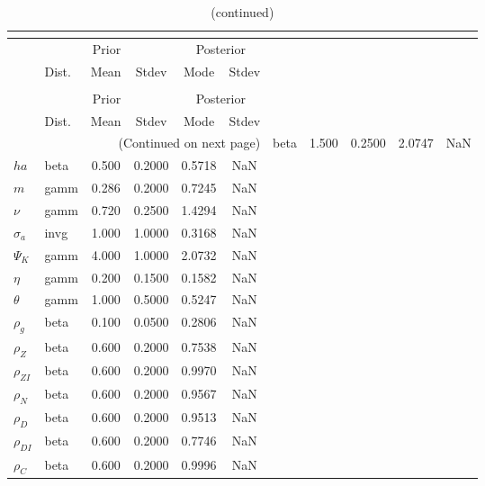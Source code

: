  
\begin{center}
\begin{longtable}{llcccc} 
\caption{Results from posterior maximization (parameters)}\\
 \label{Table:Posterior:1}\\
\toprule 
  & \multicolumn{3}{c}{Prior}  &  \multicolumn{2}{c}{Posterior} \\
  \cmidrule(r{.75em}){2-4} \cmidrule(r{.75em}){5-6}
  & Dist. & Mean  & Stdev & Mode & Stdev \\ 
\midrule \endfirsthead 
\caption{(continued)}\\
 \bottomrule 
  & \multicolumn{3}{c}{Prior}  &  \multicolumn{2}{c}{Posterior} \\
  \cmidrule(r{.75em}){2-4} \cmidrule(r{.75em}){5-6}
  & Dist. & Mean  & Stdev & Mode & Stdev \\ 
\midrule \endhead 
\bottomrule \multicolumn{6}{r}{(Continued on next page)}\endfoot 
\bottomrule\endlastfoot 
${\gamma}$ & beta &   1.500 & 0.2500 &   2.0747 &     NaN \\ 
${ha}$ & beta &   0.500 & 0.2000 &   0.5718 &     NaN \\ 
${m}$ & gamm &   0.286 & 0.2000 &   0.7245 &     NaN \\ 
$\nu$ & gamm &   0.720 & 0.2500 &   1.4294 &     NaN \\ 
${\sigma_a}$ & invg &   1.000 & 1.0000 &   0.3168 &     NaN \\ 
${\Psi_K}$ & gamm &   4.000 & 1.0000 &   2.0732 &     NaN \\ 
${\eta}$ & gamm &   0.200 & 0.1500 &   0.1582 &     NaN \\ 
${\theta}$ & gamm &   1.000 & 0.5000 &   0.5247 &     NaN \\ 
${\rho_g}$ & beta &   0.100 & 0.0500 &   0.2806 &     NaN \\ 
${\rho_Z}$ & beta &   0.600 & 0.2000 &   0.7538 &     NaN \\ 
${\rho_{ZI}}$ & beta &   0.600 & 0.2000 &   0.9970 &     NaN \\ 
${\rho_N}$ & beta &   0.600 & 0.2000 &   0.9567 &     NaN \\ 
${\rho_D}$ & beta &   0.600 & 0.2000 &   0.9513 &     NaN \\ 
${\rho_{DI}}$ & beta &   0.600 & 0.2000 &   0.7746 &     NaN \\ 
${\rho_C}$ & beta &   0.600 & 0.2000 &   0.9996 &     NaN \\ 
\end{longtable}
 \end{center}
